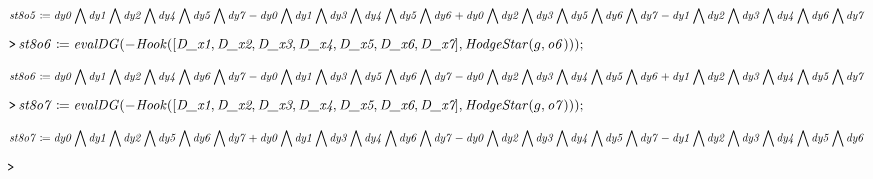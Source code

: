 \documentclass{article}
\begin{document}
\begin{dmath}\label{(22)}
\mathit{st8o5} \coloneqq \mathit{dy0} \bigwedge  \mathit{dy1}  \bigwedge  \mathit{dy2}  \bigwedge  \mathit{dy4}  \bigwedge  \mathit{dy5} 
\\
 \bigwedge  \mathit{dy7} -\mathit{dy0} \bigwedge  \mathit{dy1}  \bigwedge  \mathit{dy3}  \bigwedge  \mathit{dy4}  \bigwedge  \mathit{dy5} 
\\
 \bigwedge  \mathit{dy6} +\mathit{dy0} \bigwedge  \mathit{dy2}  \bigwedge  \mathit{dy3}  \bigwedge  \mathit{dy5}  \bigwedge  \mathit{dy6} 
\\
 \bigwedge  \mathit{dy7} -\mathit{dy1} \bigwedge  \mathit{dy2}  \bigwedge  \mathit{dy3}  \bigwedge  \mathit{dy4}  \bigwedge  \mathit{dy6} 
\\
 \bigwedge  \mathit{dy7} 
\end{dmath}
\mapleinput
{$ \displaystyle \texttt{>\,} \mathit{st8o6} \coloneqq \mathit{evalDG} (-\mathit{Hook} ([\textit{D\_x1} ,\textit{D\_x2} ,\textit{D\_x3} ,\textit{D\_x4} ,\textit{D\_x5} ,\textit{D\_x6} ,\textit{D\_x7}],\mathit{HodgeStar} (g ,\mathit{o6})));\, $}

\begin{dmath}\label{(23)}
\mathit{st8o6} \coloneqq \mathit{dy0} \bigwedge  \mathit{dy1}  \bigwedge  \mathit{dy2}  \bigwedge  \mathit{dy4}  \bigwedge  \mathit{dy6} 
\\
 \bigwedge  \mathit{dy7} -\mathit{dy0} \bigwedge  \mathit{dy1}  \bigwedge  \mathit{dy3}  \bigwedge  \mathit{dy5}  \bigwedge  \mathit{dy6} 
\\
 \bigwedge  \mathit{dy7} -\mathit{dy0} \bigwedge  \mathit{dy2}  \bigwedge  \mathit{dy3}  \bigwedge  \mathit{dy4}  \bigwedge  \mathit{dy5} 
\\
 \bigwedge  \mathit{dy6} +\mathit{dy1} \bigwedge  \mathit{dy2}  \bigwedge  \mathit{dy3}  \bigwedge  \mathit{dy4}  \bigwedge  \mathit{dy5} 
\\
 \bigwedge  \mathit{dy7} 
\end{dmath}
\mapleinput
{$ \displaystyle \texttt{>\,} \mathit{st8o7} \coloneqq \mathit{evalDG} (-\mathit{Hook} ([\textit{D\_x1} ,\textit{D\_x2} ,\textit{D\_x3} ,\textit{D\_x4} ,\textit{D\_x5} ,\textit{D\_x6} ,\textit{D\_x7}],\mathit{HodgeStar} (g ,\mathit{o7})));\, $}

\begin{dmath}\label{(24)}
\mathit{st8o7} \coloneqq \mathit{dy0} \bigwedge  \mathit{dy1}  \bigwedge  \mathit{dy2}  \bigwedge  \mathit{dy5}  \bigwedge  \mathit{dy6} 
\\
 \bigwedge  \mathit{dy7} +\mathit{dy0} \bigwedge  \mathit{dy1}  \bigwedge  \mathit{dy3}  \bigwedge  \mathit{dy4}  \bigwedge  \mathit{dy6} 
\\
 \bigwedge  \mathit{dy7} -\mathit{dy0} \bigwedge  \mathit{dy2}  \bigwedge  \mathit{dy3}  \bigwedge  \mathit{dy4}  \bigwedge  \mathit{dy5} 
\\
 \bigwedge  \mathit{dy7} -\mathit{dy1} \bigwedge  \mathit{dy2}  \bigwedge  \mathit{dy3}  \bigwedge  \mathit{dy4}  \bigwedge  \mathit{dy5} 
\\
 \bigwedge  \mathit{dy6} 
\end{dmath}
\mapleinput
{$ \displaystyle \texttt{>\,}  $}
\end{document}
